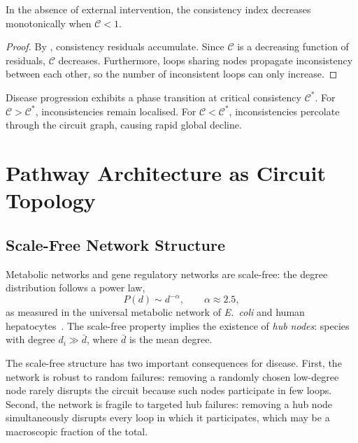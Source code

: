 \begin{theorem}
\label{thm:monotonic-decline}
In the absence of external intervention, the consistency index decreases
monotonically when $\mathcal{C} < 1$.
\end{theorem}

\begin{proof}
By , consistency residuals accumulate.  Since
$\mathcal{C}$ is a decreasing function of residuals, $\mathcal{C}$
decreases.  Furthermore, loops sharing nodes propagate inconsistency
between each other, so the number of inconsistent loops can only increase.
\end{proof}

\begin{corollary}
\label{cor:percolation}
Disease progression exhibits a phase transition at critical consistency
$\mathcal{C}^{*}$.  For $\mathcal{C} > \mathcal{C}^{*}$, inconsistencies
remain localised.  For $\mathcal{C} < \mathcal{C}^{*}$, inconsistencies
percolate through the circuit graph, causing rapid global decline.
\end{corollary}

\section{Pathway Architecture as Circuit Topology}
\label{sec:pathway-topology}

\subsection{Scale-Free Network Structure}

Metabolic networks and gene regulatory networks are scale-free: the degree
distribution follows a power law,
\begin{equation}
  P(d) \sim d^{-\alpha}, \qquad \alpha \approx 2.5,
  \label{eq:scale-free}
\end{equation}
as measured in the universal metabolic network of \textit{E.\ coli} and
human hepatocytes~\citep{barabasi2004network}.  The scale-free property
implies the existence of \emph{hub nodes}: species with degree
$d_i \gg \bar{d}$, where $\bar{d}$ is the mean degree.

The scale-free structure has two important consequences for disease.
First, the network is robust to random failures: removing a randomly
chosen low-degree node rarely disrupts the circuit because such nodes
participate in few loops.  Second, the network is fragile to targeted hub
failures: removing a hub node simultaneously disrupts every loop in which
it participates, which may be a macroscopic fraction of the total.

